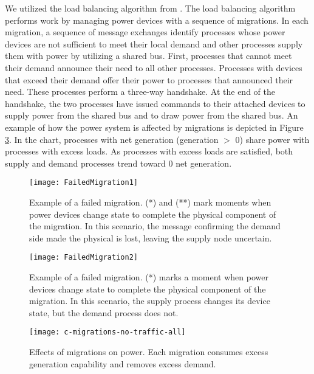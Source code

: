 We utilized the load balancing algorithm from \cite{LOADBALANCING}.
The load balancing algorithm performs work by managing power devices with a sequence of migrations\cite{HILTESTBED}.
In each migration, a sequence of message exchanges identify processes whose power devices are not sufficient to meet their local demand and other processes supply them with power by utilizing a shared bus.
First, processes that cannot meet their demand announce their need to all other processes.
Processes with devices that exceed their demand offer their power to processes that announced their need.
These processes perform a three-way handshake.
At the end of the handshake, the two processes have issued commands to their attached devices to supply power from the shared bus and to draw power from the shared bus.
An example of how the power system is affected by migrations is depicted in Figure \ref{fig:good-migrations}.
In the chart, processes with net generation (generation $>$ 0) share power with processes with excess loads.
As processes with excess loads are satisfied, both supply and demand processes trend toward 0 net generation.

\begin{figure}
\centering
\texttt{[image: FailedMigration1]}
\caption[Example of a failed migration.]{Example of a failed migration. (*) and (**) mark moments when power devices change state to complete the physical component of the migration. In this scenario, the message confirming the demand side made the physical is lost, leaving the supply node uncertain.}
\label{fig:failed-migration-1}
\end{figure}

\begin{figure}
\centering
\texttt{[image: FailedMigration2]}
\caption[Example of a failed migration.]{Example of a failed migration. (*) marks a moment when power devices change state to complete the physical component of the migration. In this scenario, the supply process changes its device state, but the demand process does not.}
\label{fig:failed-migration-2}
\end{figure}

\begin{figure}
\centering
\texttt{[image: c-migrations-no-traffic-all]}
\caption[Effects of migrations on power.]{Effects of migrations on power. Each migration consumes excess generation capability and removes excess demand.}
\label{fig:good-migrations}
\end{figure}

